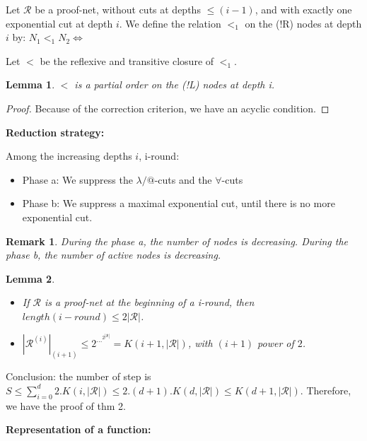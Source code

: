 \documentclass[a4paper,10pt]{article}
\newcommand{\pnet}{\mathcal{R}} %
\newtheorem{lem}{Lemma}
\newtheorem{rmk}{Remark}
\begin{document}
\par Let $\pnet$ be a proof-net, without cuts at depths $\leq (i-1)$, and with exactly one exponential cut at depth $i$. We define the relation $<_{1}$ on the (!R) nodes at depth $i$ by: $N_1 <_{1} N_2 \Leftrightarrow $\\



\par Let $<$ be the reflexive and transitive closure of $<_1$.

\begin{lem}
$<$ is a partial order on the (!L) nodes at depth i.
\end{lem}
\begin{proof}
Because of the correction criterion, we have an acyclic condition.
\end{proof}

\textbf{Reduction strategy:}
\par Among the increasing depths $i$, i-round:
\begin{itemize}
	\item Phase a: We suppress the $\lambda/@$-cuts and the $\forall$-cuts
	\item Phase b: We suppress a maximal exponential cut, until there is no more exponential cut.
\end{itemize}

\begin{rmk}
During the phase a, the number of nodes is decreasing. During the phase b, the number of active nodes is decreasing.
\end{rmk}

\begin{lem}
\begin{itemize}
\item If $\pnet$ is a proof-net at the beginning of a i-round, then $length(i-round) \leq 2 |\pnet|$.
\item $|\pnet^{(i)}|_{(i+1)} \leq 2^{\dots^{2^{|\pnet|}}} = K(i+1, |\pnet|)$, with $(i+1)$ power of $2$.
\end{itemize}
\end{lem}

\par Conclusion: the number of step is $S \leq \sum_{i=0}^{d} 2.K(i,|\pnet|) \leq 2.(d+1).K(d,|\pnet|) \leq K(d+1,|\pnet|)$. Therefore, we have the proof of thm 2.



\vspace{0.5cm}
\textbf{Representation of a function:}
\end{document}
